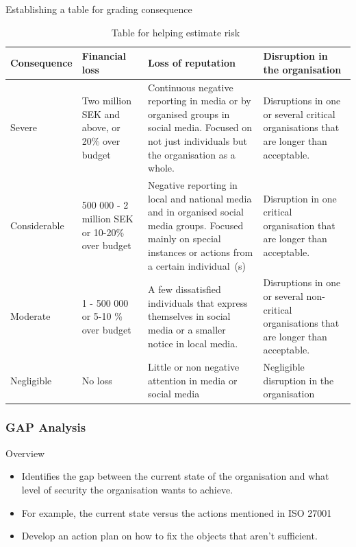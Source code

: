 \documentclass{beamer}
\begin{document}
\begin{frame}{Establishing a table for grading consequence}{\insertsubsubsectionhead}
  \begin{table}
    \tiny
    \caption{Table for helping estimate risk~\cite{msb_metodstod}}
    \begin{tabularx}{\textwidth}{X | X | X | X}
    Consequence & Financial loss & Loss of reputation & Disruption in the
    organisation\\ 
    \toprule

    Severe & Two million SEK and above, or 20\% over budget & Continuous negative
    reporting in media or by organised groups in social media. Focused on not
    just individuals but the organisation as a whole.& Disruptions in one or
    several critical organisations that are longer than acceptable.\\

    \midrule
    Considerable & 500 000 - 2 million SEK or 10-20\% over budget & Negative
    reporting in local and national media and in organised social media groups.
    Focused mainly on special instances or actions from a certain individual~(s)
    & Disruption in one critical organisation that are longer than acceptable.
    \\ 
    \midrule
    Moderate & 1 - 500 000 or 5-10 \% over budget & A few dissatisfied
    individuals that express themselves in social media or a smaller notice in
    local media.& Disruptions in one or several non-critical organisations that
    are longer than acceptable.\\ 
    \midrule
    Negligible & No loss & Little or non negative attention in media or social
    media & Negligible disruption in the organisation\\ 
    \bottomrule
  \end{tabularx}
  \end{table}
\end{frame}

\subsubsection{GAP Analysis}
\begin{frame}{Overview}{\insertsubsubsectionhead}
  \begin{itemize}
    \item Identifies the gap between the current state of the organisation and
      what level of security the organisation wants to achieve.
    \item For example, the current state versus the actions mentioned in ISO
      27001~\cite[Bilaga A]{iso27001}
    \item Develop an action plan on how to fix the objects that aren't 
      sufficient.
  \end{itemize}
\end{frame}
\end{document}
